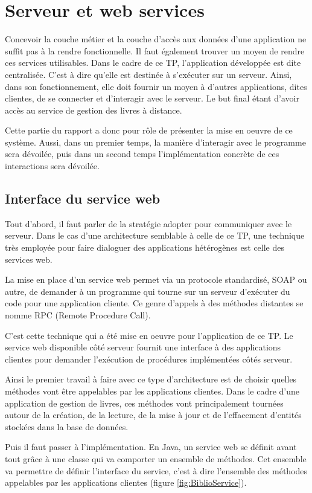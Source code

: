 \chapter{Serveur et web services}
Concevoir la couche métier et la couche d’accès aux données d’une application ne suffit pas à la rendre fonctionnelle. Il faut également trouver un moyen de rendre ces services utilisables. Dans le cadre de ce TP, l’application développée est dite centralisée. C’est à dire qu’elle est destinée à s’exécuter sur un serveur. Ainsi, dans son fonctionnement, elle doit fournir un moyen à d’autres applications, dites clientes, de se connecter et d'interagir avec le serveur. Le but final étant d’avoir accès au service de gestion des livres à distance. 

Cette partie du rapport a donc pour rôle de présenter la mise en oeuvre de ce système. Aussi, dans un premier temps, la manière d'interagir avec le programme sera dévoilée, puis dans un second temps l’implémentation concrète de ces interactions sera dévoilée.

\section{Interface du service web}
Tout d’abord, il faut parler de la stratégie adopter pour communiquer avec le serveur. Dans le cas d’une architecture semblable à celle de ce TP, une technique très employée pour faire dialoguer des applications hétérogènes est celle des services web.

La mise en place d’un service web permet via un protocole standardisé, SOAP ou autre, de demander à un programme qui tourne sur un serveur d’exécuter du code pour une application cliente. Ce genre d’appels à des méthodes distantes se nomme RPC (Remote Procedure Call).

C’est cette technique qui a été mise en oeuvre pour l’application de ce TP. Le service web disponible côté serveur fournit une interface à des applications clientes pour demander l’exécution de procédures implémentées côtés serveur.

Ainsi le premier travail à faire avec ce type d’architecture est de choisir quelles méthodes vont être appelables par les applications clientes. Dans le cadre d’une application de gestion de livres, ces méthodes vont principalement tournées autour de la création, de la lecture, de la mise à jour et de l’effacement d’entités stockées dans la base de données.

Puis il faut passer à l’implémentation. En Java, un service web se définit avant tout grâce à une classe qui va comporter un ensemble de méthodes. Cet ensemble va permettre de définir l’interface du service, c’est à dire l’ensemble des méthodes appelables par les applications clientes (figure \ref{fig:BiblioService}).


